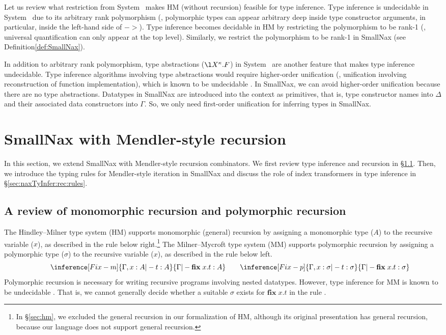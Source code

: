 Let us review what restriction from System \F\ makes HM (without recursion)
feasible for type inference. Type inference is undecidable in System \F\ 
due to its arbitrary rank polymorphism (\ie, polymorphic types can appear
arbitrary deep inside type constructor arguments, in particular, inside
the left-hand side of $->$). Type inference becomes decidable in HM
by restricting the polymorphism to be rank-1 (\ie, universal quantification
can only appear at the top level). Similarly, we restrict the polymorphism
to be rank-1 in SmallNax (see Definition\;\ref{def:SmallNax}).

In addition to arbitrary rank polymorphism, type abstractions
($\l X^\kappa.F$) in System \Fw\ are another feature that makes
type inference undecidable. Type inference algorithms involving
type abstractions would require higher-order unification (\ie, unification
involving reconstruction of function implementation), which is known to be
undecidable \cite{Gol81}. In SmallNax, we can avoid higher-order unification
because there are no type abstractions. Datatypes in SmallNax are introduced
into the context as primitives, that is, type constructor names into $\Delta$ and
their associated data constructors into $\Gamma$. So, we only need
first-order unification for inferring types in SmallNax.

\section{SmallNax with Mendler-style recursion}
\label{sec:naxTyInfer:rec}
In this section, we extend SmallNax with Mendler-style recursion combinators.
We first review type inference and recursion in \S\ref{sec:naxTyInfer:rec:MM}.
Then, we introduce the typing rules for Mendler-style iteration in SmallNax
and discuss the role of index transformers in type inference
in \S\ref{sec:naxTyInfer:rec:rules}.

\subsection{A review of monomorphic recursion and polymorphic recursion}
\label{sec:naxTyInfer:rec:MM}
The Hindley--Milner type system (HM) \cite{DamMil82} supports
monomorphic (general) recursion by assigning a monomorphic type ($A$)
to the recursive variable ($x$), as described in the rule 
below right.\footnote{
	In \S\ref{sec:hm}, we excluded the general recursion in
	our formalization of HM, although its original presentation
	has general recursion, because our language does not support
	general recursion.}
The Milner--Mycroft type system (MM) \cite{Myc84} supports
polymorphic recursion by assigning a polymorphic type ($\sigma$)
to the recursive variable ($x$), as described in the rule 
below left.
\[
\qquad
\inference[\sc Fix-m]{\Gamma,x:A |- t : A}{
	\Gamma |- \textbf{fix}\;x.t : A}
\qquad
\inference[\sc Fix-p]{\Gamma,x:\sigma |- t : \sigma}{
	\Gamma |- \textbf{fix}\;x.t : \sigma}
\]
Polymorphic recursion is necessary for writing recursive programs
involving nested datatypes. However, type inference for MM is
known to be undecidable \cite{Hen93}. That is, we cannot generally
decide whether a suitable $\sigma$ exists for $\textbf{fix}\;x.t$
in the rule \rulename{Fix-p}.

